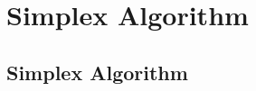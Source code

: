 \documentclass[../alevelmaths.tex]{subfiles}
\begin{document}
\chapter{Simplex Algorithm}
\section{Simplex Algorithm}
\end{document}

